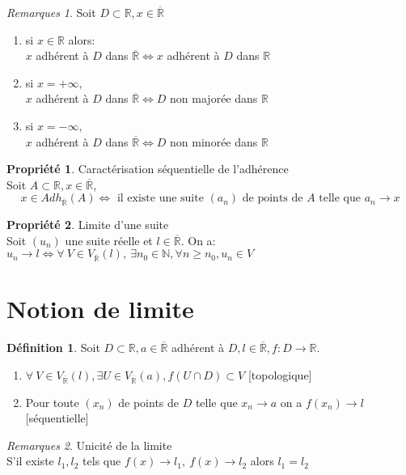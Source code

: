 \documentclass[fleqn]{article}
\theoremstyle{definition} \newtheorem*{defi}{D\'efinition}
\theoremstyle{definition} \newtheorem*{theo}{Th\'eor\`eme}
\theoremstyle{definition} \newtheorem*{prop}{Propri\'et\'e}
\theoremstyle{remark} \newtheorem*{rqs}{Remarques}
\begin{document}
\begin{rqs}
	Soit $D \subset \mathbb{R}, x \in \overline{\mathbb{R}}$
	\begin{enumerate}
		\item si $x \in \mathbb{R}$ alors: \\
			$x$ adh\'erent \`a $D$ dans $\overline{\mathbb{R}} \Leftrightarrow x$ adh\'erent \`a $D$ dans $\mathbb{R}$
		\item si $x = +\infty,$ \\
			$x$ adh\'erent \`a $D$ dans $\overline{\mathbb{R}} \Leftrightarrow D$ non major\'ee dans $\mathbb{R}$
		\item si $x = -\infty,$ \\
			$x$ adh\'erent \`a $D$ dans $\overline{\mathbb{R}} \Leftrightarrow D$ non minor\'ee dans $\mathbb{R}$
	\end{enumerate}
\end{rqs}
\begin{prop} Caract\'erisation s\'equentielle de l'adh\'erence \\
	Soit $A \subset \mathbb{R}, x \in \overline{\mathbb{R}}$,
	\[x \in Adh_{\overline{\mathbb{R}}%
	}(A) \Leftrightarrow \text{ il existe une suite } (a_n) \text{ de points de } A \text{ telle que } a_n \rightarrow x\]
\end{prop}

\begin{prop} Limite d'une suite \\
	Soit $(u_n)$ une suite r\'eelle et $l \in \overline{\mathbb{R}}$. On a: \\
	$u_n \rightarrow l \Leftrightarrow \forall\ V \in V_{\overline{\mathbb{R}}%
	}(l),\ \exists n_0 \in \mathbb{N}, \forall n \geq n_0, u_n \in V$
\end{prop}

\section{Notion de limite}
\begin{defi}
	Soit $D \subset \mathbb{R}, a \in \overline{\mathbb{R}}$ adh\'erent \`a $D, l \in \overline{\mathbb{R}}, f: D \rightarrow \mathbb{R}$.
	\begin{enumerate}
		\item $\forall\ V \in V_{\overline{\mathbb{R}}%
		}(l), \exists U \in V_{\overline{\mathbb{R}}%
		}(a), f(U \cap D) \subset V$ [topologique]
		\item Pour toute $(x_n)$ de points de $D$ telle que $x_n \rightarrow a$ on a $f(x_n) \rightarrow l $ [s\'equentielle]
	\end{enumerate}

	\begin{rqs} Unicit\'e de la limite \\
		S'il existe $l_1, l_2$ tels que $f(x) \rightarrow l_1,\ f(x) \rightarrow l_2$ alors $l_1 = l_2$
	\end{rqs}

\end{defi}
\end{document}
